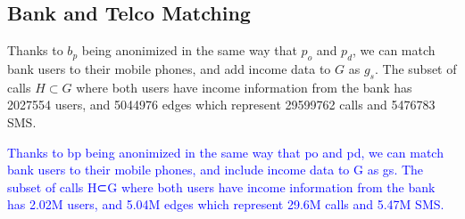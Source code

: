 \subsection{Bank and Telco Matching}

Thanks to \( b_p \) being anonimized in the same way that \( p_o \) and \( p_d \), we can match bank users to their mobile phones, and add income data to \( G \) as \( g_s \). The subset of calls \( H \subset G \) where both users have income information from the bank has \num{2027554} users, and \num{5044976} edges which represent \num{29599762} calls and \num{5476783} SMS.

\textcolor{blue}{Thanks to bp being anonimized in the same way that po and pd, we can match bank users to their mobile phones, and include income data to G as gs. The subset of calls H⊂G where both users have income information from the bank has 2.02M users, and 5.04M edges which represent 29.6M calls and 5.47M SMS.}